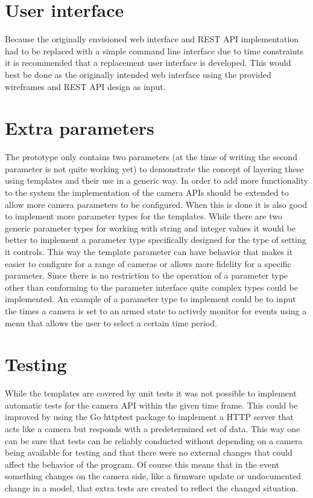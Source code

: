 \section{User interface}
Because the originally envisioned web interface and REST API implementation had to be replaced with a simple command line interface due to time constraints it is recommended that a replacement user interface is developed.
This would best be done as the originally intended web interface using the provided wireframes and REST API design as input.

\section{Extra parameters}
The prototype only contains two parameters (at the time of writing the second parameter is not quite working yet) to demonstrate the concept of layering these using templates and their use in a generic way.
In order to add more functionality to the system the implementation of the camera APIs should be extended to allow more camera parameters to be configured.
When this is done it is also good to implement more parameter types for the templates.
While there are two generic parameter types for working with string and integer values it would be better to implement a parameter type specifically designed for the type of setting it controls.
This way the template parameter can have behavior that makes it easier to configure for a range of cameras or allows more fidelity for a specific parameter.
Since there is no restriction to the operation of a parameter type other than conforming to the parameter interface quite complex types could be implemented.
An example of a parameter type to implement could be to input the times a camera is set to an armed state to actively monitor for events using a menu that allows the user to select a certain time period.

\section{Testing}
While the templates are covered by unit tests it was not possible to implement automatic tests for the camera API within the given time frame.
This could be improved by using the Go httptest package \cite{noauthor_golang_nodate} to implement a HTTP server that acts like a camera but responds with a predetermined set of data.
This way one can be sure that tests can be reliably conducted without depending on a camera being available for testing and that there were no external changes that could affect the behavior of the program.
Of course this means that in the event something changes on the camera side, like a firmware update or undocumented change in a model, that extra tests are created to reflect the changed situation.

